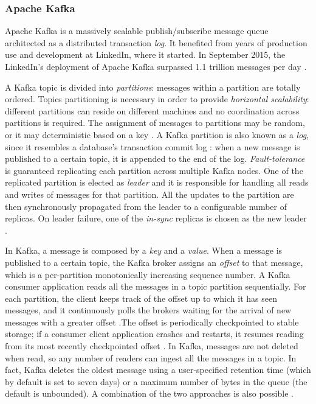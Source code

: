 \subsubsection{Apache Kafka}
Apache Kafka is a massively scalable publish/subscribe message queue architected as a distributed transaction \emph{log}. It benefited from years of production use and development at LinkedIn, where it started. In September 2015, the LinkedIn’s deployment of Apache Kafka surpassed 1.1 trillion messages per day \cite{fastdataarchitecture}.  

A Kafka topic is divided into \emph{partitions}: messages within a partition are totally ordered. Topics partitioning is necessary in order to provide \emph{horizontal scalability}: different partitions can reside on different machines and no coordination across partitions is required. The assignment of messages to partitions may be random, or it may deterministic based on a key \cite{philosophydistributeddata}. A Kafka partition is also known as a \emph{log}, since it resembles a database’s transaction commit log \cite{philosophydistributeddata}: when a new message is published to a certain topic, it is appended to the end of the log. \emph{Fault-tolerance} is guaranteed replicating each partition across multiple Kafka nodes. One of the replicated partition is elected as \emph{leader} and it is responsible for handling all reads and writes of messages for that partition. All the updates to the partition are then synchronously propagated from the leader to a configurable number of replicas. On leader failure, one of the \emph{in-sync} replicas is chosen as the new leader \cite{philosophydistributeddata}. 

In Kafka, a message is composed by a \emph{key} and a \emph{value}. When a message is published to a certain topic, the Kafka broker assigns an \emph{offset} to that message, which is a per-partition monotonically increasing sequence number. A Kafka consumer application reads all the messages in a topic partition sequentially. For each partition, the client keeps track of the offset up to which it has seen messages, and it continuously polls the brokers waiting for the arrival of new messages with a greater offset .The offset is periodically checkpointed to stable storage; if a consumer client application crashes and restarts, it resumes reading from its most recently checkpointed offset \cite{philosophydistributeddata}. In Kafka, messages are not deleted when read, so any number of readers can ingest all the messages in a topic. In fact, Kafka deletes the oldest message using a user-specified retention time (which by default is set to seven days) or a maximum number of bytes in the queue (the default is unbounded). A combination of the two approaches is also possible \cite{fastdataarchitecture}.

